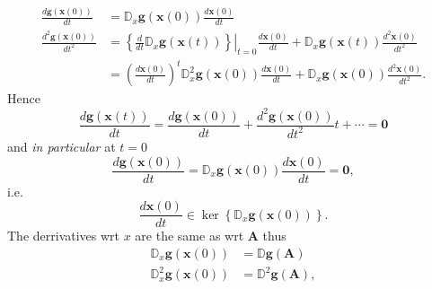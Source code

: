 \documentclass[aps,preprint]{revtex4}%
\begin{document}
\begin{align}
\frac{d\boldsymbol{g}\left(  \boldsymbol{x}\left(  0\right)  \right)  }{dt}
&  =\mathbb{D}_{x}\boldsymbol{g}\left(  \boldsymbol{x}\left(  0\right)
\right)  \frac{d\boldsymbol{x}\left(  0\right)  }{dt}\nonumber\\
\frac{d^{2}\boldsymbol{g}\left(  \boldsymbol{x}\left(  0\right)  \right)
}{dt^{2}}  &  =\left.  \left\{  \frac{d}{dt}\mathbb{D}_{x}\boldsymbol{g}%
\left(  \boldsymbol{x}\left(  t\right)  \right)  \right\}  \right\vert
_{t=0}\frac{d\boldsymbol{x}\left(  0\right)  }{dt}+\mathbb{D}_{x}%
\boldsymbol{g}\left(  \boldsymbol{x}\left(  t\right)  \right)  \frac
{d^{2}\boldsymbol{x}\left(  0\right)  }{dt^{2}}\nonumber\\
&  =\left(  \frac{d\boldsymbol{x}\left(  0\right)  }{dt}\right)
^{t}\mathbb{D}_{x}^{2}\boldsymbol{g}\left(  \boldsymbol{x}\left(  0\right)
\right)  \frac{d\boldsymbol{x}\left(  0\right)  }{dt}+\mathbb{D}%
_{x}\boldsymbol{g}\left(  \boldsymbol{x}\left(  0\right)  \right)  \frac
{d^{2}\boldsymbol{x}\left(  0\right)  }{dt^{2}}.
\end{align}
Hence
\begin{equation}
\frac{d\boldsymbol{g}\left(  \boldsymbol{x}\left(  t\right)  \right)  }%
{dt}=\frac{d\boldsymbol{g}\left(  \boldsymbol{x}\left(  0\right)  \right)
}{dt}+\frac{d^{2}\boldsymbol{g}\left(  \boldsymbol{x}\left(  0\right)
\right)  }{dt^{2}}t+\cdots=\mathbf{0}%
\end{equation}
and \emph{in particular }at $t=0$\emph{ }%
\begin{equation}
\frac{d\boldsymbol{g}\left(  \boldsymbol{x}\left(  0\right)  \right)  }%
{dt}=\mathbb{D}_{x}\boldsymbol{g}\left(  \boldsymbol{x}\left(  0\right)
\right)  \frac{d\boldsymbol{x}\left(  0\right)  }{dt}=\mathbf{0},
\end{equation}
i.e.
\begin{equation}
\frac{d\boldsymbol{x}\left(  0\right)  }{dt}\in\ker\left\{  \mathbb{D}%
_{x}\boldsymbol{g}\left(  \boldsymbol{x}\left(  0\right)  \right)  \right\}  .
\end{equation}
The derrivatives wrt $x$ are the same as wrt $\boldsymbol{A}$ thus
\begin{align}
\mathbb{D}_{x}\boldsymbol{g}\left(  \boldsymbol{x}\left(  0\right)  \right)
&  =\mathbb{D}\boldsymbol{g}\left(  \boldsymbol{A}\right) \nonumber\\
\mathbb{D}_{x}^{2}\boldsymbol{g}\left(  \boldsymbol{x}\left(  0\right)
\right)   &  =\mathbb{D}^{2}\boldsymbol{g}\left(  \boldsymbol{A}\right)  ,
\end{align}
\end{document}

